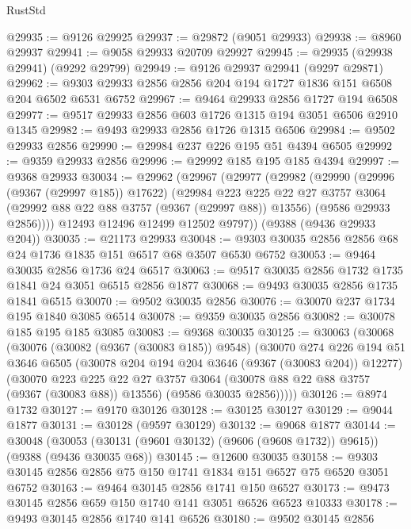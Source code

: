 \begin{lexlean}{RustStd}
\begin{coremodule}
@29935 := @9126 @29925
@29937 := @29872 (@9051 @29933)
@29938 := @8960 @29937
@29941 := @9058 @29933 @20709 @29927
@29945 := @29935 (@29938 @29941) (@9292 @29799)
@29949 := @9126 @29937 @29941 (@9297 @29871)
@29962 := @9303 @29933 @2856 @2856 @204 @194 @1727 @1836 @151 @6508 @204 @6502 @6531 @6752
@29967 := @9464 @29933 @2856 @1727 @194 @6508
@29977 := @9517 @29933 @2856 @603 @1726 @1315 @194 @3051 @6506 @2910 @1345
@29982 := @9493 @29933 @2856 @1726 @1315 @6506
@29984 := @9502 @29933 @2856
@29990 := @29984 @237 @226 @195 @51 @4394 @6505
@29992 := @9359 @29933 @2856
@29996 := @29992 @185 @195 @185 @4394
@29997 := @9368 @29933
@30034 := @29962
    (@29967
      (@29977
        (@29982
          (@29990
            (@29996 (@9367 (@29997 @185)) @17622)
            (@29984
              @223
              @225
              @22
              @27
              @3757
              @3064
              (@29992 @88 @22 @88 @3757 (@9367 (@29997 @88)) @13556)
              (@9586 @29933 @2856))))
        @12493
        @12496
        @12499
        @12502
        @9797))
    (@9388 (@9436 @29933 @204))
@30035 := @21173 @29933
@30048 := @9303 @30035 @2856 @2856 @68 @24 @1736 @1835 @151 @6517 @68 @3507 @6530 @6752
@30053 := @9464 @30035 @2856 @1736 @24 @6517
@30063 := @9517 @30035 @2856 @1732 @1735 @1841 @24 @3051 @6515 @2856 @1877
@30068 := @9493 @30035 @2856 @1735 @1841 @6515
@30070 := @9502 @30035 @2856
@30076 := @30070 @237 @1734 @195 @1840 @3085 @6514
@30078 := @9359 @30035 @2856
@30082 := @30078 @185 @195 @185 @3085
@30083 := @9368 @30035
@30125 := @30063
    (@30068
      (@30076
        (@30082 (@9367 (@30083 @185)) @9548)
        (@30070
          @274
          @226
          @194
          @51
          @3646
          @6505
          (@30078 @204 @194 @204 @3646 (@9367 (@30083 @204)) @12277)
          (@30070
            @223
            @225
            @22
            @27
            @3757
            @3064
            (@30078 @88 @22 @88 @3757 (@9367 (@30083 @88)) @13556)
            (@9586 @30035 @2856)))))
@30126 := @8974 @1732
@30127 := @9170 @30126
@30128 := @30125 @30127
@30129 := @9044 @1877
@30131 := @30128 (@9597 @30129)
@30132 := @9068 @1877
@30144 := @30048
    (@30053 (@30131 (@9601 @30132) (@9606 (@9608 @1732)) @9615))
    (@9388 (@9436 @30035 @68))
@30145 := @12600 @30035
@30158 := @9303 @30145 @2856 @2856 @75 @150 @1741 @1834 @151 @6527 @75 @6520 @3051 @6752
@30163 := @9464 @30145 @2856 @1741 @150 @6527
@30173 := @9473 @30145 @2856 @659 @150 @1740 @141 @3051 @6526 @6523 @10333
@30178 := @9493 @30145 @2856 @1740 @141 @6526
@30180 := @9502 @30145 @2856

\end{coremodule}
\end{lexlean}

